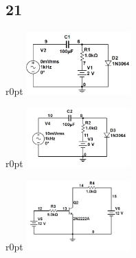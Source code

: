 \documentclass[UTF8,a4paper,12pt]{ctexart}
\begin{document}
\subsection{21}
\begin {wrapfigure}{r}{0pt}
\includegraphics [width=40mm]{cap/10.JPG}
\end {wrapfigure}

\begin {wrapfigure}{r}{0pt}
\includegraphics [width=40mm]{cap/11.JPG}
\end {wrapfigure}

\begin {wrapfigure}{r}{0pt}
\includegraphics [width=40mm]{cap/12.JPG}
\end {wrapfigure}

\end{document}
